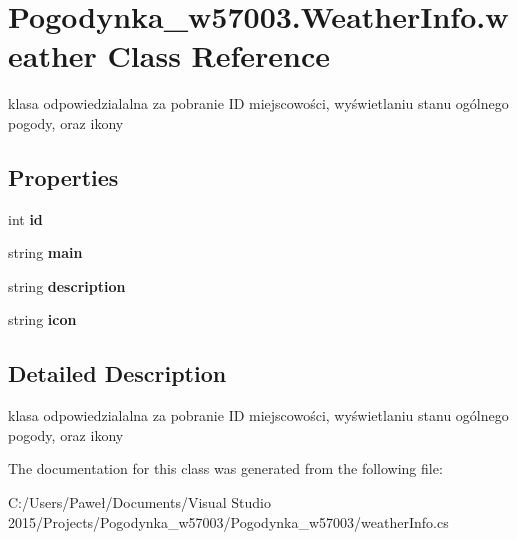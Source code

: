 \hypertarget{class_pogodynka__w57003_1_1_weather_info_1_1weather}{}\section{Pogodynka\+\_\+w57003.\+Weather\+Info.\+weather Class Reference}
\label{class_pogodynka__w57003_1_1_weather_info_1_1weather}


klasa odpowiedzialalna za pobranie ID miejscowości, wyświetlaniu stanu ogólnego pogody, oraz ikony  


\subsection*{Properties}
\begin{DoxyCompactItemize}
\item 
\mbox{\label{class_pogodynka__w57003_1_1_weather_info_1_1weather_ad13cdfb70892c179a30fd88187f56341}} 
int {\bfseries id}
\item 
\mbox{\label{class_pogodynka__w57003_1_1_weather_info_1_1weather_ae0f4146575ca595bb15444d1a3abfd1e}} 
string {\bfseries main}
\item 
\mbox{\label{class_pogodynka__w57003_1_1_weather_info_1_1weather_a16997ec7e57894a50cb62d907983580c}} 
string {\bfseries description}
\item 
\mbox{\label{class_pogodynka__w57003_1_1_weather_info_1_1weather_a6713039fb698f6049ae82536da925574}} 
string {\bfseries icon}
\end{DoxyCompactItemize}


\subsection{Detailed Description}
klasa odpowiedzialalna za pobranie ID miejscowości, wyświetlaniu stanu ogólnego pogody, oraz ikony 



The documentation for this class was generated from the following file\+:\begin{DoxyCompactItemize}
\item 
C\+:/\+Users/\+Paweł/\+Documents/\+Visual Studio 2015/\+Projects/\+Pogodynka\+\_\+w57003/\+Pogodynka\+\_\+w57003/weather\+Info.\+cs\end{DoxyCompactItemize}
